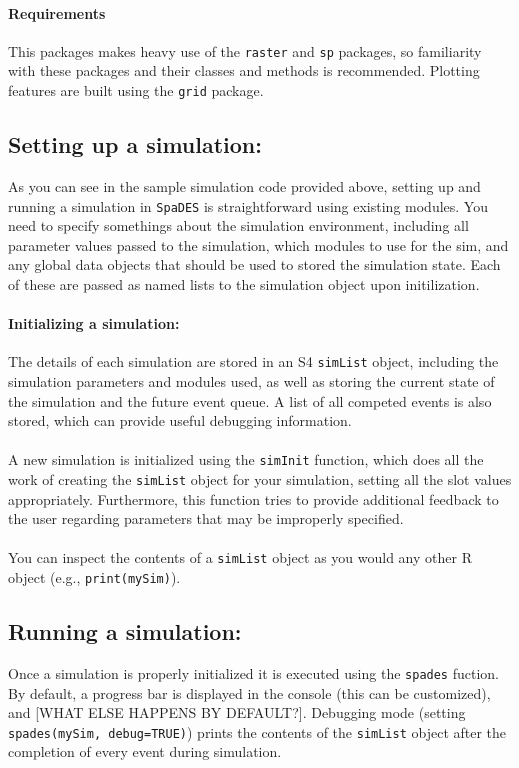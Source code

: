\documentclass{article}
\begin{document}
\paragraph{Requirements}
This packages makes heavy use of the \texttt{raster} and \texttt{sp} packages, so familiarity with these packages and their classes and methods is recommended. Plotting features are built using the \texttt{grid} package.

\subsection{Setting up a simulation:}
As you can see in the sample simulation code provided above, setting up and running a simulation in \texttt{SpaDES} is straightforward using existing modules. You need to specify somethings about the simulation environment, including all parameter values passed to the simulation, which modules to use for the sim, and any global data objects that should be used to stored the simulation state. Each of these are passed as named lists to the simulation object upon initilization.

\paragraph{Initializing a simulation:}
The details of each simulation are stored in an S4 \texttt{simList} object, including the simulation parameters and modules used, as well as storing the current state of the simulation and the future event queue. A list of all competed events is also stored, which can provide useful debugging information.

\paragraph{}
A new simulation is initialized using the \texttt{simInit} function, which does all the work of creating the \texttt{simList} object for your simulation, setting all the slot values appropriately. Furthermore, this function tries to provide additional feedback to the user regarding parameters that may be improperly specified.

\paragraph{}
You can inspect the contents of a \texttt{simList} object as you would any other \textsf{R} object (e.g., \texttt{print(mySim)}).

\subsection{Running a simulation:}
Once a simulation is properly initialized it is executed using the \texttt{spades} fuction. By default, a progress bar is displayed in the console (this can be customized), and [WHAT ELSE HAPPENS BY DEFAULT?]. Debugging mode (setting \texttt{spades(mySim, debug=TRUE)}) prints the contents of the \texttt{simList} object after the completion of every event during simulation.
\end{document}
